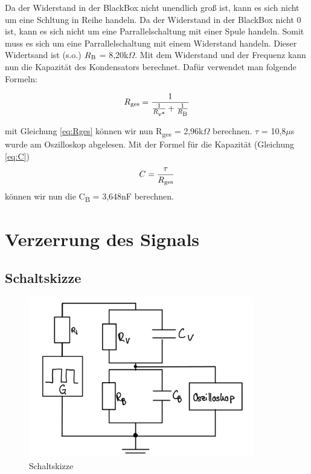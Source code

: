 Da der Widerstand in der BlackBox nicht unendlich groß ist, kann es sich nicht um
eine Schltung in Reihe handeln. Da der Widerstand in der BlackBox nicht 0 ist, kann
es sich nicht um eine Parrallelschaltung mit einer Spule handeln. Somit muss es sich
um eine Parrallelschaltung mit einem Widerstand handeln. Dieser Widertsand ist (s.o.) 
$R\textsubscript{B}$ = 8,20k$\Omega$.
Mit dem Widerstand und der Frequenz kann nun die Kapazität des Kondensators berechnet.
Dafür verwendet man folgende Formeln:

\begin{equation}
	R\textsubscript{ges} = \frac{1}{\frac{1}{R\textsubscript{v*}} + 
	\frac{1}{R\textsubscript{B}}}
	\label{eq:Rges}
\end{equation}

mit Gleichung \ref*{eq:Rges} können wir nun R\textsubscript{ges} = 2,96k$\Omega$
berechnen.
$\tau$ = 10,8$\mu$s wurde am Oszilloskop abgelesen. Mit der Formel für die Kapazität
(Gleichung \ref*{eq:C})
\begin{equation}
	C = \frac{\tau}{R\textsubscript{ges}}
	\label{eq:C}
\end{equation}
können wir nun die C\textsubscript{B} = 3,648nF berechnen.


\section{Verzerrung des Signals}
\subsection{Schaltskizze}

\begin{figure}[H]
	\centering
	\includegraphics[height=7cm]{images/Versuch2/2_Schaltungsskizze.jpeg} 
	\caption{Schaltskizze}
	\label{fig: Schaltungsskizze}
\end{figure}

